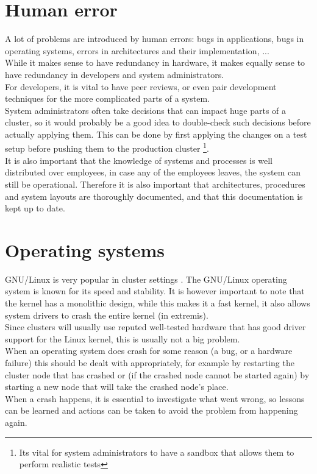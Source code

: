 \documentclass[12pt]{report}
\begin{document}
\section{Human error}
A lot of problems are introduced by human errors: bugs in
applications, bugs in operating systems, errors in architectures and
their implementation, ...\\
While it makes sense to have redundancy in hardware, it makes equally
sense to have redundancy in developers and system administrators.\\
For developers, it is vital to have peer reviews, or even pair
development techniques for the more complicated parts of a system.\\
System administrators often take decisions that can impact huge parts
of a cluster, so it would probably be a good idea to double-check such
decisions before actually applying them. This can be done by first
applying the changes on a test setup before pushing them to the
production cluster \footnote{Its vital for system administrators to
  have a sandbox that allows them to perform realistic tests}.\\
It is also important that the knowledge of systems and processes is
well distributed over employees, in case any of the employees leaves,
the system can still be operational. Therefore it is also important
that architectures, procedures and system layouts are thoroughly
documented, and that this documentation is kept up to date. 

\section{Operating systems}
GNU/Linux is very popular in cluster settings
\cite{server_market_share}.
The GNU/Linux operating system is known for its speed and stability.
It is however important to note that the kernel has a monolithic
design, while this makes it a fast kernel, it also allows system drivers
to crash the entire kernel (in extremis). \\
Since clusters will usually use reputed well-tested hardware that has
good driver support for the Linux kernel, this is usually not  a big
problem.\\
When an operating system does crash for some reason (a bug, or a
hardware failure) this should be dealt with appropriately, for example
by restarting the cluster node that has crashed or (if the crashed
node cannot be started again) by starting a new node that will take
the crashed node's place.\\
When a crash happens, it is essential to investigate what went wrong,
so lessons can be learned and actions can be taken to avoid the
problem from happening again.
\end{document}
